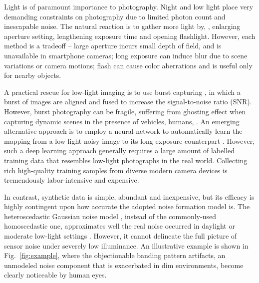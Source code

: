\documentclass[10pt,twocolumn,letterpaper]{article}
\begin{document}
Light is of paramount importance to photography. 
 Night and low light place very demanding
constraints on photography due to limited photon count and inescapable noise.
The natural reaction
is to gather more light by, \eg, enlarging aperture
setting, lengthening exposure time and opening flashlight. However, each method
is a tradeoff -- large aperture incurs small depth of field, and is unavailable
in smartphone cameras; long exposure can induce blur due to scene variations or
camera motions; flash can cause color aberrations and is useful only for
nearby objects. 

A practical rescue for low-light imaging is to use burst capturing
\cite{Mildenhall_2018_CVPR,Hasinoff2016Burst,Liu2014Fast,liba2019handheld}, in which a burst of
images are aligned and fused to increase the signal-to-noise ratio (SNR). However, 
burst photography can be fragile, suffering from ghosting effect
\cite{Hasinoff2016Burst,Shen_2019_ICCV} when capturing dynamic scenes in the presence of
vehicles, humans, \etc .
An emerging alternative approach is to employ a neural network to automatically
learn the mapping from a low-light noisy image to its long-exposure counterpart
\cite{Chen_2018_CVPR}. However, such a deep learning approach generally requires
a large amount of labelled training data that resembles low-light photographs in the real
world. 
Collecting rich
high-quality training samples from diverse modern camera devices is
tremendously labor-intensive and expensive.

In contrast, synthetic data is simple, abundant and inexpensive,
but its efficacy is highly contingent upon how accurate the adopted noise formation model is. 
The heteroscedastic Gaussian noise model \cite{Foi2008Practical}, instead of the
commonly-used homoscedastic one, approximates well the real noise occurred in
daylight or moderate low-light settings
\cite{Brooks2018Unprocessing,Shi2018Toward,Hasinoff2016Burst}. However, it cannot
delineate the full picture of sensor noise under severely low
illuminance. An illustrative example is shown in Fig.~\ref{fig:example}, where the
objectionable banding pattern artifacts, an unmodeled noise component that is
exacerbated in dim environments, become clearly noticeable by human eyes.
\end{document}
